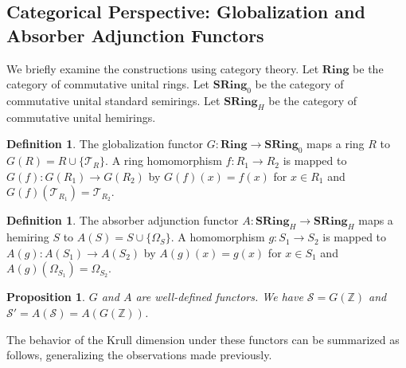 \documentclass[11pt, a4paper]{article}
\theoremstyle{plain}
\newtheorem{proposition}[theorem]{Proposition}
\theoremstyle{definition}
\newtheorem{definition}[theorem]{Definition}
\numberwithin{equation}{section}
\newcommand{\Z}{\mathbb{Z}}
\newcommand{\Tobj}{\mathcal{T}} %
\newcommand{\OmegaObj}{\Omega} %
\newcommand{\SemiringS}{\mathcal{S}}
\newcommand{\SemiringSPrime}{\mathcal{S}'}
\DeclareMathOperator{\Spec}{Spec}
\newcommand{\Ring}{\mathbf{Ring}}
\newcommand{\SRing}{\mathbf{SRing}}
\newcommand{\SRingH}{\mathbf{SRing}_H}
\begin{document}
\begin{center}
\end{center}

\subsection{Categorical Perspective: Globalization and Absorber Adjunction Functors}

We briefly examine the constructions using category theory. Let $\Ring$ be the category of commutative unital rings. Let $\SRing_0$ be the category of commutative unital standard semirings. Let $\SRingH$ be the category of commutative unital hemirings.

\begin{definition}
The globalization functor $G: \Ring \to \SRing_0$ maps a ring $R$ to $G(R)=R\cup\{\Tobj_R\}$. A ring homomorphism $f: R_1 \to R_2$ is mapped to $G(f): G(R_1) \to G(R_2)$ by $G(f)(x)=f(x)$ for $x\in R_1$ and $G(f)(\Tobj_{R_1})=\Tobj_{R_2}$.
\end{definition}

\begin{definition}
The absorber adjunction functor $A: \SRingH \to \SRingH$ maps a hemiring $S$ to $A(S)=S\cup\{\Omega_S\}$. A homomorphism $g: S_1 \to S_2$ is mapped to $A(g): A(S_1) \to A(S_2)$ by $A(g)(x)=g(x)$ for $x\in S_1$ and $A(g)(\Omega_{S_1})=\Omega_{S_2}$.
\end{definition}

\begin{proposition}
$G$ and $A$ are well-defined functors. We have $\SemiringS = G(\Z)$ and $\SemiringSPrime = A(\SemiringS) = A(G(\Z))$.
\end{proposition}

The behavior of the Krull dimension under these functors can be summarized as follows, generalizing the observations made previously.
\end{document}
